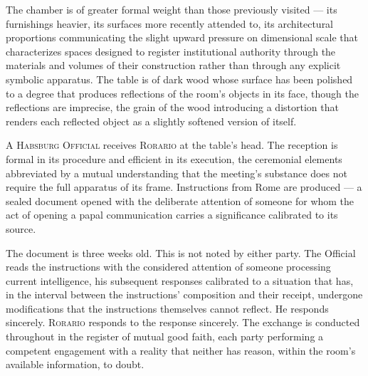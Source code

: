 \documentclass[12pt, oneside]{article}
\newenvironment{action}{%
  \vspace{0.6em}%
  \noindent\ignorespaces%
}{%
  \par\vspace{0.6em}%
}
\begin{document}
\begin{action}
The chamber is of greater formal weight than those previously visited --- its furnishings heavier, its surfaces more recently attended to, its architectural proportions communicating the slight upward pressure on dimensional scale that characterizes spaces designed to register institutional authority through the materials and volumes of their construction rather than through any explicit symbolic apparatus. The table is of dark wood whose surface has been polished to a degree that produces reflections of the room's objects in its face, though the reflections are imprecise, the grain of the wood introducing a distortion that renders each reflected object as a slightly softened version of itself.

A \textsc{Habsburg Official} receives \textsc{Rorario} at the table's head. The reception is formal in its procedure and efficient in its execution, the ceremonial elements abbreviated by a mutual understanding that the meeting's substance does not require the full apparatus of its frame. Instructions from Rome are produced --- a sealed document opened with the deliberate attention of someone for whom the act of opening a papal communication carries a significance calibrated to its source.

The document is three weeks old. This is not noted by either party. The Official reads the instructions with the considered attention of someone processing current intelligence, his subsequent responses calibrated to a situation that has, in the interval between the instructions' composition and their receipt, undergone modifications that the instructions themselves cannot reflect. He responds sincerely. \textsc{Rorario} responds to the response sincerely. The exchange is conducted throughout in the register of mutual good faith, each party performing a competent engagement with a reality that neither has reason, within the room's available information, to doubt.
\end{action}
\end{document}

